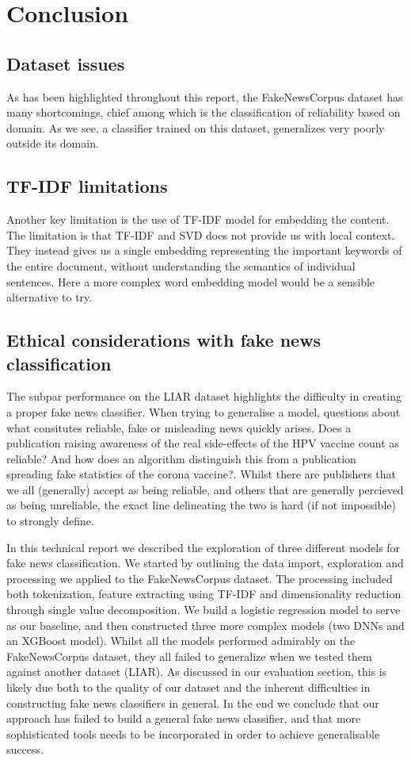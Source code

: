 \section{Conclusion}

\subsection{Dataset issues}
As has been highlighted throughout this report, the FakeNewsCorpus dataset has many shortcomings, chief among which is
the classification of reliability based on domain. As we see, a classifier trained on this dataset, generalizes very
poorly outside its domain.

\subsection{TF-IDF limitations}
Another key limitation is the use of TF-IDF model for embedding the content. The limitation is that TF-IDF and SVD does
not provide us with local context. They instead gives us a single embedding representing the important keywords of the
entire document, without understanding the semantics of individual sentences. Here a more complex word embedding model
would be a sensible alternative to try.

\subsection{Ethical considerations with fake news classification}
The subpar performance on the LIAR dataset highlights the difficulty in creating a proper fake news classifier. When trying to
generalise a model, questions about what consitutes reliable, fake or misleading news quickly arises. Does a publication raising awareness
of the real side-effects of the HPV vaccine count as reliable? And how does an algorithm distinguish this from a
publication spreading fake statistics of the corona vaccine?. Whilst there are publishers that we all (generally)
accept as being reliable, and others that are generally percieved as being unreliable, the exact line delineating the
two is hard (if not impossible) to strongly define.


In this technical report we described the exploration of three different models for fake news classification. We started
by outlining the data import, exploration and processing we applied to the FakeNewsCorpus dataset. The processing
included both tokenization, feature extracting using TF-IDF and dimensionality reduction through single value
decomposition. We build a logistic regression model to serve as our baseline, and then constructed three more complex
models (two DNNs and an XGBoost model). Whilst all the models performed admirably on the FakeNewsCorpus dataset, they
all failed to generalize when we tested them against another dataset (LIAR). As discussed in our evaluation section,
this is likely due both to the quality of our dataset and the inherent difficulties in constructing fake news
classifiers in general. In the end we conclude that our approach has failed to build a general fake news classifier, and
that more sophisticated tools needs to be incorporated in order to achieve generalisable success.

